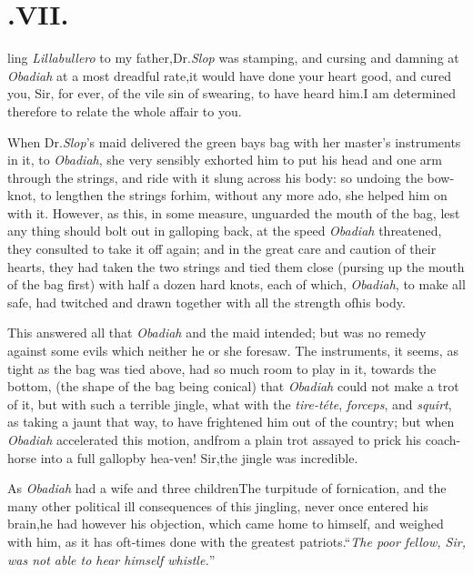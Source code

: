 \documentclass{article}
\begin{document}
\null
\section{.\quad  VII.}

 \break
ling \textit{Lillabullero} to my father,\tsk\break Dr.\@ \textit{Slop}
was stamping, and cursing and damning at \textit{Obadiah} at a most
dreadful rate,\tsh it would have done your heart good, and
cured you, Sir, for ever, of the vile sin of swearing, to have heard
him.\tsk I am determined therefore to relate the whole affair to
you.

When Dr.\@ \textit{Slop}’s maid delivered the green bays bag
with her master’s instruments in it, to \textit{Obadiah}, she
very sensibly exhorted him to put his head and one arm through
the strings, and ride with it slung across his body: so undoing
the
bow-knot, to lengthen the strings for\break him, without any
more ado, she helped him on with it. However, as this, in some
measure, unguarded the mouth of the bag, lest any thing should
bolt out in galloping back, at the speed \textit{Obadiah}
threatened, they consulted to take it off again; and in the
great care and caution of their hearts, they had taken the two
strings and tied them close (pursing up the mouth of the bag
first) with half a dozen hard knots, each of which,
\textit{Obadiah}, to make all safe, had twitched and drawn
together with all the strength of\break his body.

This answered all that \textit{Obadiah} and the maid intended;
but was no remedy against some evils which neither he or she
foresaw.  The instruments, it seems, as tight as the bag was
tied above, had 
so much room to play in it, towards the bottom, (the shape of
the bag being conical) that \textit{Obadiah} could not make a
trot of it, but with such a terrible jingle, what with the
\textit{tire-téte}, \textit{forceps}, and \textit{squirt}, as
 taking a jaunt
that way, to have frightened him out of the country; but when
\textit{Obadiah} accelerated this motion, and\break from a plain trot
assayed to prick his coach-horse into a full gallop\tsk by
hea-\break ven! Sir,\tsk the jingle was incredible.

As \textit{Obadiah} had a wife and three children\tsk The
turpitude of fornication, and the many other political ill
consequences of this jingling, never once entered his
brain,\tsk he had however his objection, which came home
to himself, and weigh\-ed with him, as it has oft-times done with
the greatest patriots.\tsk “\textit{The poor fel\-low, Sir, was
not able to hear himself whistle.}”
\end{document}
